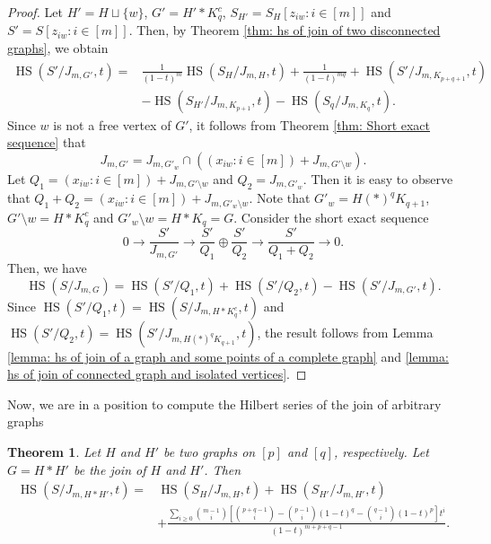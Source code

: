 \documentclass[12pt,reqno]{amsart}
\newcommand \hs{\operatorname{HS}}
\theoremstyle{plain}
\newtheorem{theorem}{Theorem}[section]
\theoremstyle{definition}
\begin{document}
 \begin{proof}
     Let $H'=H\sqcup \{w\}$, $G'=H'*K_q^c$, $S_{H'}=S_H[z_{iw}:i\in [m]]$ and $S'=S[z_{iw}:i\in [m]]$. Then, by Theorem \ref{thm: hs of join of two disconnected graphs}, we obtain
     \begin{align*}
\hs(S'/J_{m,G'},t)=&\frac{1}{(1-t)^m}\hs(S_H/J_{m,H},t)+\frac{1}{(1-t)^{mq}}+\hs(S'/J_{m,K_{p+q+1}},t)\\
        &-\hs(S_{H'}/J_{m,K_{p+1}},t)-\hs(S_q/J_{m,K_{q}},t).
    \end{align*}
    Since $w$ is not a free vertex of $G'$, it follows from Theorem \ref{thm: Short exact sequence} that $$J_{m,G'}=J_{m,G'_w}\cap \left ((x_{iw}:i\in [m])+J_{m,G'\setminus w}\right ).$$ Let $Q_1=(x_{iw}:i\in [m])+J_{m,G'\setminus w} $ and $Q_2=J_{m,G'_w}$. Then it is easy to observe that $Q_1+Q_2=(x_{iw}:i\in [m])+J_{m,G'_w\setminus w}$. Note that $G'_w=H(*)^qK_{q+1}$, $G'\setminus w=H*K_q^c$ and $G'_w\setminus w=H*K_q=G$. Consider the short exact sequence 
      \[ 0\rightarrow{\frac{S'}{J_{m,G'}}}\rightarrow \frac{S'}{Q_1}\oplus \frac{S'}{Q_2}\rightarrow \frac{S'}{Q_1+Q_2}\rightarrow 0.\] Then, we have
          $$\hs(S/J_{m,G})=\hs(S'/Q_1,t)+\hs(S'/Q_2,t)-\hs(S'/J_{m,G'},t).$$
Since $\hs(S'/Q_1,t)=\hs(S/J_{m,H*K_q^c},t)$ and $\hs(S'/Q_2,t)=\hs(S'/J_{m,H(*)^qK_{q+1}},t)$, the result follows from Lemma \ref{lemma: hs of join of a graph and some points of a complete graph} and \ref{lemma: hs of join of connected graph and isolated vertices}.          
 \end{proof}
 Now, we are in a position to compute the Hilbert series of the join of arbitrary graphs
 \begin{theorem}\label{thm: hs of join of graphs}
     Let $H$  and $H'$ be two graphs on $[p]$ and $[q]$, respectively. Let $G=H*H'$ be the join of $H$ and $H'$. Then 
     \begin{align*}
        \hs(S/J_{m,H*H'},t)=&\hs(S_H/J_{m,H},t)+\hs(S_{H'}/J_{m,H'},t)\\
        & +\frac{\sum_{i\geq 0}\binom{m-1}{i}\left[\binom{p+q-1}{i}-\binom{p-1}{i}(1-t)^q-\binom{q-1}{i}(1-t)^p\right]t^i}{(1-t)^{m+p+q-1}}.
    \end{align*}
 \end{theorem}
\end{document}
